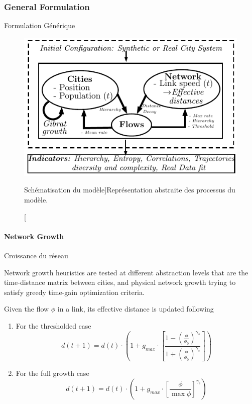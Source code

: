 \subsubsection{General Formulation}{Formulation Générique}




\begin{figure}
\includegraphics[width=\linewidth]{Figures/MacroCoEvolModel/model}
\caption[][Schématisation du modèle]{}{Représentation abstraite des processus du modèle.\label{fig:macrocoevolmodel:model}}
\end{figure}








\paragraph{Network Growth}{Croissance du réseau}



Network growth heuristics are tested at different abstraction levels that are the time-distance matrix between cities, and physical network growth trying to satisfy greedy time-gain optimization criteria.

Given the flow $\phi$ in a link, its effective distance is updated following

\begin{enumerate}
\item For the thresholded case
\[
d(t+1) = d(t)\cdot \left( 1 + g_{max} \cdot \left[\frac{1 - \left(\frac{\phi}{\phi_0}\right)^{\gamma_s}}{1 + \left(\frac{\phi}{\phi_0}\right)^{\gamma_s}}\right]\right)
\]
\item For the full growth case
\[
d(t+1) = d(t)\cdot \left(1 + g_{max} \cdot \left[\frac{\phi}{\max \phi}\right]^{\gamma_s}\right)
\]
\end{enumerate}

